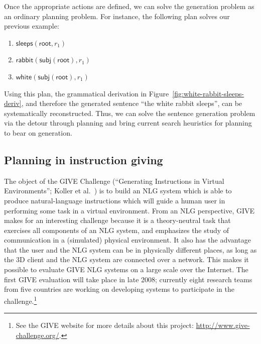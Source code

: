 Once the appropriate actions are defined, we can solve the generation
problem as an ordinary planning problem. For instance, the following plan
solves our previous example:
%
\begin{enumerate}
\item $\mathsf{sleeps}(\mathsf{root}, r_1)$
\item $\mathsf{rabbit}(\mathsf{subj}(\mathsf{root}), r_1)$
\item $\mathsf{white}(\mathsf{subj}(\mathsf{root}), r_1)$
\end{enumerate}
%
Using this plan, the grammatical derivation in
Figure~\ref{fig:white-rabbit-sleeps-deriv}, and therefore the
generated sentence ``the white rabbit sleeps'', can be systematically
reconstructed. Thus, we can solve the sentence generation problem via
the detour through planning and bring current search heuristics for
planning to bear on generation.



\subsection{Planning in instruction giving}

The object of the GIVE Challenge (``Generating Instructions in Virtual
Environments''; Koller et al.\
\citeyear{alexander07:_shared_task_propos}) is to build an NLG system
which is able to produce natural-language instructions which will
guide a human user in performing some task in a virtual
environment. From an NLG perspective, GIVE makes for an interesting
challenge because it is a theory-neutral task that exercises all
components of an NLG system, and emphasizes the study of communication
in a (simulated) physical environment. It also has the advantage that
the user and the NLG system can be in physically different places, as
long as the 3D client and the NLG system are connected over a
network. This makes it possible to evaluate GIVE NLG systems on a
large scale over the Internet. The first GIVE evaluation will take
place in late 2008; currently eight research teams from five countries
are working on developing systems to participate in the
challenge.\footnote{See the GIVE website for more details about this
  project: \url{http://www.give-challenge.org/}.}

